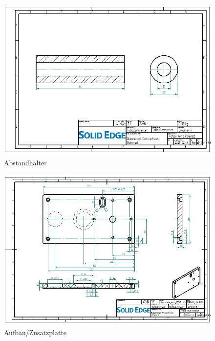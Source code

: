 \begin{figure} [H]
	\begin{center}
		\includegraphics[angle=90]{figures/mechanik/Seitenplatte_Abstandhalter_Zeichnung.jpg}
		\caption{Abstandhalter}
		\label{fig:Abstandhalter}
	\end{center}
\end{figure}


\begin{figure} [H]
	\begin{center}
		\includegraphics[angle=90]{figures/mechanik/Aufbau_Seitenplatte_Links_Zeichn.jpg}
		\caption{Aufbau/Zusatzplatte}
		\label{fig:Aufbau/Zusatzplatte}
	\end{center}
\end{figure}


